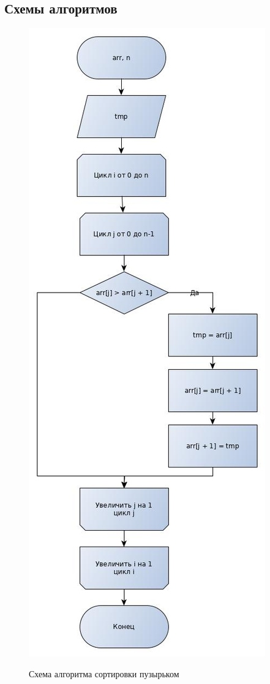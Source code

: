 \documentclass[a4paper, 14pt]{article}
\begin{document}
        \subsection{Схемы алгоритмов}
        	\begin{figure}[h]
        	\begin{center}
        		{\includegraphics[scale=0.48]{bubble}}
        		\caption{Схема алгоритма сортировки пузырьком}
        	\end{center}
        \end{figure}
\end{document}
